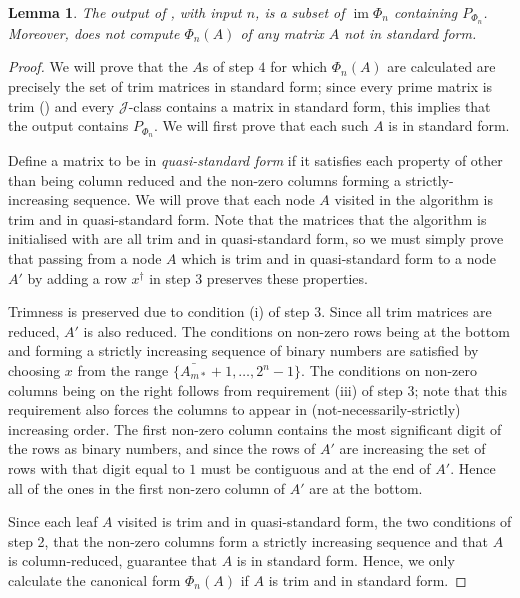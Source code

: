 \documentclass[11pt]{article}
\newtheorem{lemma}[thm]{Lemma}
\numberwithin{equation}{section}
\DeclareMathOperator{\im}{im}
\newcommand{\J}{\mathscr{J}}
\begin{document}
\begin{lemma}
  The output of , with input $n$, is a subset of
  $\im\Phi_n$ containing $P_{\Phi_n}$. Moreover, 
  does not compute $\Phi_n(A)$ of any matrix $A$ not in standard form.
\end{lemma} 
\begin{proof}
  We will prove that the $A$s of step $4$ for which $\Phi_n(A)$ are calculated
  are precisely the set of trim matrices in standard form; since every prime
  matrix is trim () and every $\J$-class
  contains a matrix in standard form, this implies that the output contains
  $P_{\Phi_n}$. We will first prove that each such $A$ is in standard form.

  Define a matrix to be in \emph{quasi-standard form} if it satisfies each
  property of  other than being column reduced and the
  non-zero columns forming a strictly-increasing sequence.
  We will prove that each node $A$ visited in the algorithm is trim and in
  quasi-standard form. Note that the matrices that the algorithm is initialised
  with are all trim and in quasi-standard form, so we must simply prove that
  passing from a node $A$ which is trim and in quasi-standard form to a node
  $A'$ by adding a row $x^{\dagger}$ in step $3$ preserves these properties.

  Trimness is preserved due to condition (i) of step $3$. Since all trim
  matrices are reduced, $A'$ is also reduced. The conditions on non-zero rows
  being at the bottom and forming a strictly increasing sequence of binary
  numbers are satisfied by choosing $x$ from the range $\{\bar{A_{m*}} + 1,
    \ldots, 2^n - 1\}$.  The conditions on non-zero columns being on the right
  follows from requirement (iii) of step $3$; note that this requirement also
  forces the columns to appear in (not-necessarily-strictly) increasing order.
  The first non-zero column contains the most significant digit of the rows as
  binary numbers, and since the rows of $A'$ are increasing the set of rows with
  that digit equal to $1$ must be contiguous and at the end of $A'$. Hence all
  of the ones in the first non-zero column of $A'$ are at the bottom.

  Since each leaf $A$ visited is trim and in quasi-standard form, the two
  conditions of step 2, that the non-zero columns form a strictly increasing
  sequence and that $A$ is column-reduced, guarantee that $A$ is in standard
  form. Hence, we only calculate the canonical form $\Phi_n(A)$ if $A$ is trim
  and in standard form.


\end{proof}
\end{document}
